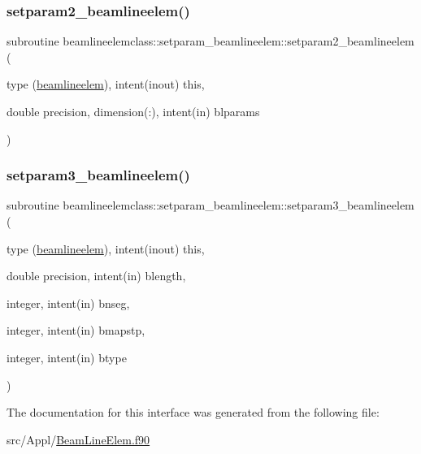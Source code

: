 \mbox{\label{interfacebeamlineelemclass_1_1setparam__beamlineelem_aa3175f56e092bd4d1b4a3269c4a993e5}} 
\subsubsection{\texorpdfstring{setparam2\_beamlineelem()}{setparam2\_beamlineelem()}}
{\footnotesize\ttfamily subroutine beamlineelemclass\+::setparam\+\_\+beamlineelem\+::setparam2\+\_\+beamlineelem (\begin{DoxyParamCaption}\item[{type (\mbox{\hyperlink{namespacebeamlineelemclass_structbeamlineelemclass_1_1beamlineelem}{beamlineelem}}), intent(inout)}]{this,  }\item[{double precision, dimension(\+:), intent(in)}]{blparams }\end{DoxyParamCaption})}

\mbox{\label{interfacebeamlineelemclass_1_1setparam__beamlineelem_a2e3199d4c1442173d48fcb2fcad61ad5}} 
\subsubsection{\texorpdfstring{setparam3\_beamlineelem()}{setparam3\_beamlineelem()}}
{\footnotesize\ttfamily subroutine beamlineelemclass\+::setparam\+\_\+beamlineelem\+::setparam3\+\_\+beamlineelem (\begin{DoxyParamCaption}\item[{type (\mbox{\hyperlink{namespacebeamlineelemclass_structbeamlineelemclass_1_1beamlineelem}{beamlineelem}}), intent(inout)}]{this,  }\item[{double precision, intent(in)}]{blength,  }\item[{integer, intent(in)}]{bnseg,  }\item[{integer, intent(in)}]{bmapstp,  }\item[{integer, intent(in)}]{btype }\end{DoxyParamCaption})}



The documentation for this interface was generated from the following file\+:\begin{DoxyCompactItemize}
\item 
src/\+Appl/\mbox{\hyperlink{_beam_line_elem_8f90}{Beam\+Line\+Elem.\+f90}}\end{DoxyCompactItemize}

